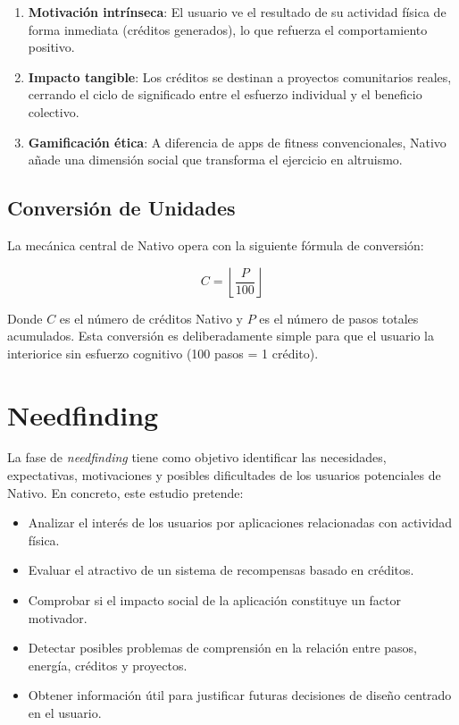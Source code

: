 \documentclass[12pt, a4paper]{article}
\begin{document}
\begin{enumerate}[leftmargin=*, label=\textbf{\arabic*.}]
  \item \textbf{Motivación intrínseca}: El usuario ve el resultado de su actividad física de forma inmediata (créditos generados), lo que refuerza el comportamiento positivo.
  \item \textbf{Impacto tangible}: Los créditos se destinan a proyectos comunitarios reales, cerrando el ciclo de significado entre el esfuerzo individual y el beneficio colectivo.
  \item \textbf{Gamificación ética}: A diferencia de apps de fitness convencionales, Nativo añade una dimensión social que transforma el ejercicio en altruismo.
\end{enumerate}

\subsection{Conversión de Unidades}

La mecánica central de Nativo opera con la siguiente fórmula de conversión:

\begin{equation}
  C = \left\lfloor \frac{P}{100} \right\rfloor
\end{equation}

Donde $C$ es el número de créditos Nativo y $P$ es el número de pasos totales acumulados. Esta conversión es deliberadamente simple para que el usuario la interiorice sin esfuerzo cognitivo (100 pasos = 1 crédito).

\newpage

\section{Needfinding}

La fase de \textit{needfinding} tiene como objetivo identificar las necesidades, expectativas, motivaciones y posibles dificultades de los usuarios potenciales de Nativo. En concreto, este estudio pretende:

\begin{itemize}
    \item Analizar el interés de los usuarios por aplicaciones relacionadas con actividad física.
    \item Evaluar el atractivo de un sistema de recompensas basado en créditos.
    \item Comprobar si el impacto social de la aplicación constituye un factor motivador.
    \item Detectar posibles problemas de comprensión en la relación entre pasos, energía, créditos y proyectos.
    \item Obtener información útil para justificar futuras decisiones de diseño centrado en el usuario.
\end{itemize}
\end{document}
